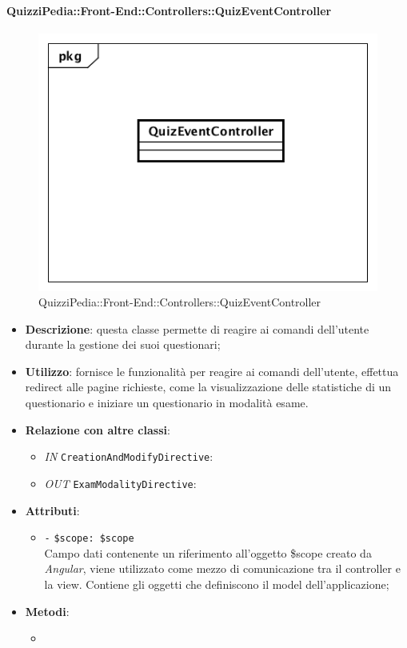 \paragraph{QuizziPedia::Front-End::Controllers::QuizEventController}
\begin{figure} [ht]
	\centering
	\includegraphics[scale=0.45]{UML/Classi/Front-End/QuizziPedia_Front-end_Controller_QuizEventController.png}
	\caption{QuizziPedia::Front-End::Controllers::QuizEventController}
\end{figure} \FloatBarrier
\begin{itemize}
	\item \textbf{Descrizione}: questa classe permette di reagire ai comandi dell'utente durante la gestione dei suoi questionari;
	\item \textbf{Utilizzo}: fornisce le funzionalità per reagire ai comandi dell'utente, effettua redirect alle pagine richieste, come la visualizzazione delle statistiche di un questionario e iniziare un questionario in modalità esame.
	\item \textbf{Relazione con altre classi}:
	\begin{itemize}
		\item \textit{IN} \texttt{CreationAndModifyDirective}:  
		\item \textit{OUT} \texttt{ExamModalityDirective}:
	\end{itemize}
	\item \textbf{Attributi}:
	\begin{itemize}
		\item \texttt{-} \texttt{\$scope: \$scope} \\
		Campo dati contenente un riferimento all’oggetto \$scope creato da \textit{Angular}, viene utilizzato come mezzo di comunicazione tra il controller e la view. Contiene gli oggetti che definiscono il model dell’applicazione;
	\end{itemize}
	\item \textbf{Metodi}:
	\begin{itemize}
		\item 
	\end{itemize}
\end{itemize}
